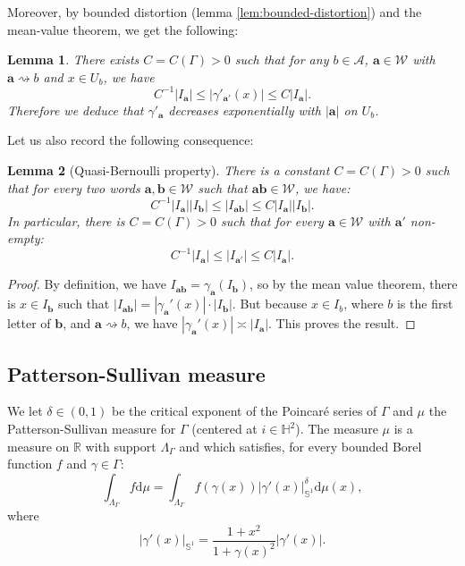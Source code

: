 \documentclass[12pt]{amsart}
\newcommand{\R}{\mathbb{R}}
\newcommand*\abs[1]{
	\left|#1\right|
}
\newcommand*\deriv{
	\mathrm{d}
}
\newtheorem{lem}{Lemma}[section]
\theoremstyle{definition}
\renewcommand{\leq}{\leqslant}
\begin{document}
Moreover, by bounded distortion (lemma \ref{lem:bounded-distortion}) and the mean-value theorem, we get the following:
\begin{lem}\label{lem:contraction}
There exists $C = C(\Gamma) > 0$ such that for any $b \in \mathcal{A}$, $\mathbf{a} \in \mathcal{W}$ with $\mathbf{a} \rightsquigarrow b$ and $x \in U_b$, we have
\[C^{-1}\abs{I_\mathbf{a}} \leq \abs{\gamma'_{\mathbf{a}'}(x)} \leq C\abs{I_\mathbf{a}}.\]
Therefore we deduce that $\gamma'_\mathbf{a}$ decreases exponentially with $\abs{\mathbf{a}}$ on $U_b$.
\end{lem}

Let us also record the following consequence:
\begin{lem}[Quasi-Bernoulli property]
\label{lem:quasi-bernoulli}
There is a constant $C = C(\Gamma) > 0$ such that for every two words $\mathbf{a}, \mathbf{b} \in \mathcal{W}$ such that $\mathbf{a}\mathbf{b} \in \mathcal{W}$, we have:
\[C^{-1}\abs{I_\mathbf{a}}\abs{I_\mathbf{b}} \leq \abs{I_{\mathbf{a}\mathbf{b}}} \leq C\abs{I_\mathbf{a}}\abs{I_\mathbf{b}}.\]
In particular, there is $C = C(\Gamma) > 0$ such that for every $\mathbf{a} \in \mathcal{W}$ with $\mathbf{a}'$ non-empty:
\[C^{-1}\abs{I_\mathbf{a}} \leq \abs{I_{\mathbf{a}'}} \leq C\abs{I_\mathbf{a}}.\]
\end{lem}
\begin{proof}
By definition, we have $I_{\mathbf{a}\mathbf{b}} = \gamma_\mathbf{a}(I_\mathbf{b})$, so by the mean value theorem, there is $x\in I_\mathbf{b}$ such that $\abs{I_{\mathbf{a}\mathbf{b}}} = \abs{\gamma_\mathbf{a}'(x)} \cdot \abs{I_\mathbf{b}}$. But because $x \in I_b$, where $b$ is the first letter of $\mathbf{b}$, and $\mathbf{a} \rightsquigarrow b$, we have $\abs{\gamma_\mathbf{a}'(x)} \asymp \abs{I_\mathbf{a}}$. This proves the result.
\end{proof}
\subsection{Patterson-Sullivan measure}
We let $\delta \in (0,1)$ be the critical exponent of the Poincaré series of $\Gamma$ and $\mu$ the Patterson-Sullivan measure for $\Gamma$ (centered at $i \in \mathbb{H}^2$). The measure $\mu$ is a measure on $\R$ with support $\Lambda_\Gamma$ and which satisfies, for every bounded Borel function $f$ and $\gamma \in \Gamma$:
\begin{equation}\int_{\Lambda_\Gamma} f\deriv \mu = \int_{\Lambda_\Gamma} f(\gamma(x))\abs{\gamma'(x)}_{\mathbb{S}^1}^\delta\deriv\mu(x),
\label{eq:equivariance}
\end{equation}
where \[\abs{\gamma'(x)}_{\mathbb{S}^1} = \frac{1 + x^2}{1 + \gamma(x)^2}\abs{\gamma'(x)}.\]
\end{document}
